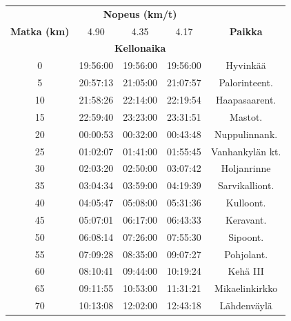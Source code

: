 \begin{multicols}{2}
\begin{table}[t]
\small\centering
\begin{tabular}{|c|ccc|c|}
\hline
\multirow{3}{*}{\textbf{Matka (km)}} & \multicolumn{3}{c|}{\textbf{Nopeus (km/t)}} & \multirow{3}{*}{\textbf{Paikka}} \\ \cline{2-4}
 & \multicolumn{1}{c|}{4.90} & \multicolumn{1}{c|}{4.35} & 4.17 &  \\ \cline{2-4}
 & \multicolumn{3}{c|}{\textbf{Kellonaika}} &  \\ \hline
0 & \multicolumn{1}{c|}{19:56:00} & \multicolumn{1}{c|}{19:56:00} & 19:56:00 & Hyvinkää \\ \hline
5 & \multicolumn{1}{c|}{20:57:13} & \multicolumn{1}{c|}{21:05:00} & 21:07:57 & Palorinteent. \\ \hline
10 & \multicolumn{1}{c|}{21:58:26} & \multicolumn{1}{c|}{22:14:00} & 22:19:54 & Haapasaarent. \\ \hline
15 & \multicolumn{1}{c|}{22:59:40} & \multicolumn{1}{c|}{23:23:00} & 23:31:51 & Mastot. \\ \hline
20 & \multicolumn{1}{c|}{00:00:53} & \multicolumn{1}{c|}{00:32:00} & 00:43:48 & Nuppulinnank. \\ \hline
25 & \multicolumn{1}{c|}{01:02:07} & \multicolumn{1}{c|}{01:41:00} & 01:55:45 & Vanhankylän kt. \\ \hline
30 & \multicolumn{1}{c|}{02:03:20} & \multicolumn{1}{c|}{02:50:00} & 03:07:42 & Holjanrinne \\ \hline
35 & \multicolumn{1}{c|}{03:04:34} & \multicolumn{1}{c|}{03:59:00} & 04:19:39 & Sarvikalliont. \\ \hline
40 & \multicolumn{1}{c|}{04:05:47} & \multicolumn{1}{c|}{05:08:00} & 05:31:36 & Kulloont. \\ \hline
45 & \multicolumn{1}{c|}{05:07:01} & \multicolumn{1}{c|}{06:17:00} & 06:43:33 & Keravant. \\ \hline
50 & \multicolumn{1}{c|}{06:08:14} & \multicolumn{1}{c|}{07:26:00} & 07:55:30 & Sipoont. \\ \hline
55 & \multicolumn{1}{c|}{07:09:28} & \multicolumn{1}{c|}{08:35:00} & 09:07:27 & Pohjolant. \\ \hline
60 & \multicolumn{1}{c|}{08:10:41} & \multicolumn{1}{c|}{09:44:00} & 10:19:24 & Kehä III \\ \hline
65 & \multicolumn{1}{c|}{09:11:55} & \multicolumn{1}{c|}{10:53:00} & 11:31:21 & Mikaelinkirkko \\ \hline
70 & \multicolumn{1}{c|}{10:13:08} & \multicolumn{1}{c|}{12:02:00} & 12:43:18 & Lähdenväylä \\ \hline

\end{tabular}
\end{table}
\end{multicols}
